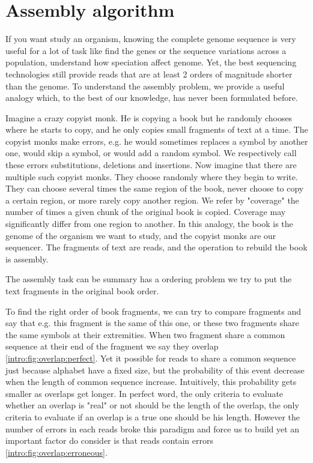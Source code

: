 \documentclass[./main.tex]{subfiles}
\begin{document}
\section{Assembly algorithm}

If you want study an organism, knowing the complete genome sequence is very useful for a lot of task like find the genes or the sequence variations across a population, understand how speciation affect genome. Yet, the best sequencing technologies still provide reads that are at least 2 orders of magnitude shorter than the genome. To understand the assembly problem, we provide a useful analogy which, to the best of our knowledge, has never been formulated before.

Imagine a crazy copyist monk. He is copying a book but he randomly chooses where he starts to copy, and he only copies small fragments of text at a time.
The copyist monks make errors, e.g. he would sometimes replaces a symbol by another one, would skip a symbol, or would add a random symbol. We respectively call these errors substitutions, deletions and insertions.
Now imagine that there are multiple such copyist monks.
They choose randomly where they begin to write. They can choose several times the same region of the book, never choose to copy a certain region, or more rarely copy another region. We refer by "coverage" the number of times a given chunk of the original book is copied. Coverage may significantly differ from one region to another.
In this analogy, the book is the genome of the organism we want to study, and the copyist monks are our sequencer. The fragments of text are reads, and the operation to rebuild the book is assembly.

The assembly task can be summary has a ordering problem we try to put the text fragments in the original book order.

To find the right order of book fragments, we can try to compare fragments and say that e.g. this fragment is the same of this one, or these two fragments share the same symbols at their extremities. When two fragment share a common sequence at their end of the fragment we say they overlap \ref{intro:fig:overlap:perfect}. Yet it possible for reads to share a common sequence just because alphabet have a fixed size, but the probability of this event decrease when the length of common sequence increase. Intuitively, this probability gets smaller as overlaps get longer. In perfect word, the only criteria to evaluate whether an overlap is "real" or not should be the length of the overlap, the only criteria to evaluate if an overlap is a true one should be his length. However the number of errors in each reads broke this paradigm and force us to build  yet an important factor do consider is that reads contain errors \ref{intro:fig:overlap:erroneous}.
\end{document}
